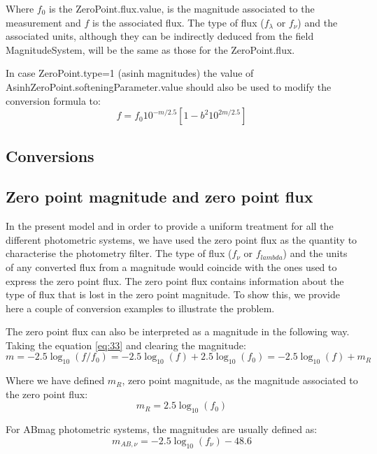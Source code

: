 \documentclass[11pt,a4paper]{ivoa}
\begin{document}
Where $f_0$ is the ZeroPoint.flux.value, is the magnitude associated to the
measurement and $f$ is the associated flux. The type of flux ($f_\lambda $ or $f_\nu $)
and the associated units, although they can be indirectly deduced from the field
MagnitudeSystem, will be the same as those for the ZeroPoint.flux.
\par
In case ZeroPoint.type=1 (asinh magnitudes) the value of
AsinhZeroPoint.softeningParameter.value should also be used to modify the conversion
formula to:
\begin{equation} \label{eq:34}
f = f_0 10^{-m/2.5}\left[ 1 - b^2 10^{2m/2.5}\right]
\end{equation}

\begin{appendices}
\section{Conversions}
\subsection{Zero point magnitude and zero point flux} \label{a.1conversion}
In the present model and in order to provide a uniform treatment for all the
different photometric systems, we have used the zero point flux as the quantity
to characterise the photometry filter. The type of flux ($f_\nu $ or $f_{lambda}$)
and the units of any converted flux from a magnitude would coincide with the ones
used to express the zero point flux. The zero point flux contains information
about the type of flux that is lost in the zero point magnitude. To show this, we
provide here a couple of conversion examples to illustrate the problem.
\par
The zero point flux can also be interpreted as a magnitude in the following way.
Taking the equation \ref{eq:33} and clearing the magnitude:
\begin{equation} \label{eq:35}
m=-2.5\log_{10}(f/f_0 )=-2.5\log_{10}(f)+2.5\log_{10}(f_0 )=-2.5\log_{10} (f)+m_R
\end{equation}

Where we have defined $m_R$, zero point magnitude, as the magnitude associated to
the zero point flux:
\begin{equation} \label{eq:36}
m_R = 2.5\log_{10} (f_0 )
\end{equation}

For ABmag photometric systems, the magnitudes are usually defined as:
\begin{equation} \label{eq:37}
m_{AB,\nu } = -2.5\log_{10} (f_\nu ) - 48.6
\end{equation}


\end{appendices}
\end{document}
